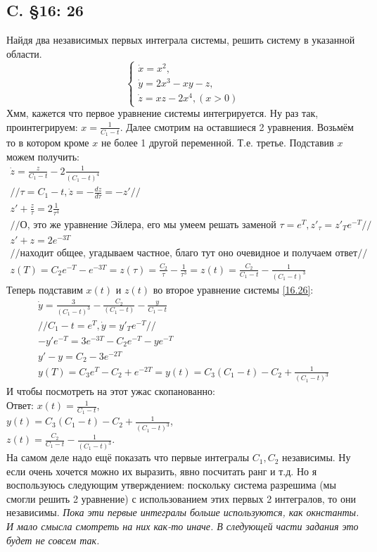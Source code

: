 \documentclass{article}
\begin{document}
\subsection{C. \S16: 26}   
Найдя два независимых первых интеграла системы, решить систему в указанной области.
\begin{equation}\label{16.26}
    \begin{cases}
        \dot x = x^2,\\
        \dot y = 2x^3-xy-z,\\
        \dot z = xz - 2x^4, (x>0)
    \end{cases}
\end{equation}
Хмм, кажется что первое уравнение системы интегрируется. Ну раз так, проинтегрируем: $x=\frac{1}{C_1-t}$. Далее смотрим на оставшиеся 2 уравнения. Возьмём то в котором кроме $x$ не более 1 другой переменной. Т.е. третье. Подставив $x$ можем получить:
\begin{gather*}
    \dot z = \frac{z}{C_1-t} -2 \frac{1}{(C_1-t)^4}\\
    // \tau = C_1-t, \dot z = -\frac{dz}{d \tau}=-z'  // \\
    z'+\frac{z}{\tau}=2 \frac{1}{\tau^4}\\
    // \text{О, это же уравнение Эйлера, его мы умеем решать заменой } \tau=e^T, z'_\tau=z'_T e^{-T}// \\
    z'+z=2e^{-3T}\\
    //\text{находит общее, угадываем частное, благо тут оно очевидное и получаем ответ}// \\
    z(T)=C_2 e^{-T}-e^{-3T}=z(\tau)=\frac{C_2}{\tau}-\frac{1}{\tau^3}=z(t)=\frac{C_2}{C_1-t}-\frac{1}{(C_1-t)^3}
\end{gather*}
Теперь подставим $x(t)$ и $z(t)$ во второе уравнение системы \ref{16.26}:
\begin{gather*}
    \dot y = \frac{3}{(C_1-t)^3}-\frac{C_2}{(C_1-t)}-\frac{y}{C_1-t}\\
    //C_1-t=e^{T}, \dot y = y'_T e^{-T}//\\
    -y' e^{-T} = 3e^{-3T}-C_2 e^{-T}-y e^{-T}\\
    y'-y=C_2-3e^{-2T}\\
    y(T)=C_3 e^T-C_2+e^{-2 T}=y(t)=C_3(C_1-t)-C_2+\frac{1}{(C_1-t)^3}
\end{gather*}
И чтобы посмотреть на этот ужас скопанованно:\\
Ответ: $x(t)=\frac{1}{C_1-t}$,\\
        $y(t)=C_3(C_1-t)-C_2+\frac{1}{(C_1-t)^3}$,\\
        $z(t)=\frac{C_2}{C_1-t}-\frac{1}{(C_1-t)^3}$.\\
На самом деле надо ещё показать что первые интегралы $C_1,C_2$ независимы. Ну если очень хочется можно их выразить, явно посчитать ранг и т.д. Но я воспользуюсь следующим утверждением: поскольку система разрешима (мы смогли решить 2 уравнение) с использованием этих первых 2 интегралов, то они независимы.
 \textcolor[rgb]{0.480469,0.566406,0.480469}{\textit{Пока эти первые интегралы больше используются, как окнстанты. И мало смысла смотреть на них как-то иначе. В следующей части задания это будет не совсем так.}}
\end{document}

